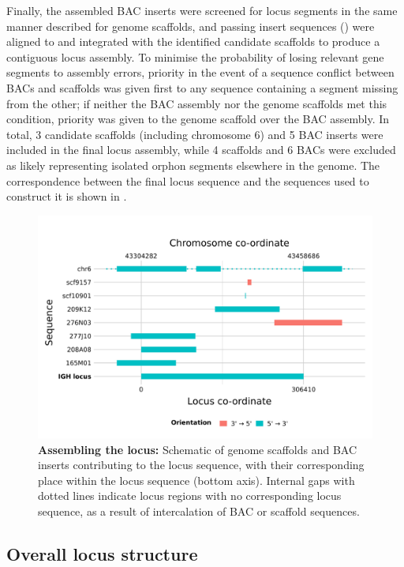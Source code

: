 Finally, the assembled BAC inserts were screened for \igh{} locus segments in the same manner described for genome scaffolds, and passing insert sequences () were aligned to and integrated with the identified candidate scaffolds to produce a contiguous locus assembly. To minimise the probability of losing relevant gene segments to assembly errors, priority in the event of a sequence conflict between BACs and scaffolds was given first to any sequence containing a segment missing from the other; if neither the BAC assembly nor the genome scaffolds met this condition, priority was given to the genome scaffold over the BAC assembly. In total, 3 candidate scaffolds (including chromosome 6) and 5 BAC inserts were included in the final locus assembly, while 4 scaffolds and 6 BACs were excluded as likely representing isolated \igh{} orphon segments elsewhere in the genome. The correspondence between the final locus sequence and the sequences used to construct it is shown in .

\begin{figure}
\centering
\includegraphics[width=\textwidth]{_Figures/png/nfu-locus-aln}
\caption[Assembling the \Nfu \igh{} locus]{\textbf{Assembling the \Nfu \igh{} locus:} Schematic of genome scaffolds and BAC inserts contributing to the \Nfu \igh{} locus sequence, with their corresponding place within the locus sequence (bottom axis). Internal gaps with dotted lines indicate locus regions with no corresponding locus sequence, as a result of intercalation of BAC or scaffold sequences.}
\label{fig:nfu-locus-aln}
\end{figure}

\subsection{Overall locus structure}
\label{sec:nfu-locus-structure}
	

